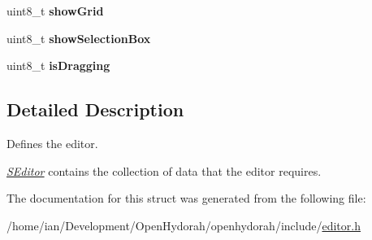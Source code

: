 \begin{DoxyCompactItemize}
\item 
\hypertarget{structSEditor_a3c96843fcda0f280e3e8c560393cebbf}{uint8\-\_\-t {\bfseries show\-Grid}}\label{structSEditor_a3c96843fcda0f280e3e8c560393cebbf}

\item 
\hypertarget{structSEditor_a7b57627167cf38fe3892e0267c89b108}{uint8\-\_\-t {\bfseries show\-Selection\-Box}}\label{structSEditor_a7b57627167cf38fe3892e0267c89b108}

\item 
\hypertarget{structSEditor_aea52ebcc1b436458c8a0c918a2e6352b}{uint8\-\_\-t {\bfseries is\-Dragging}}\label{structSEditor_aea52ebcc1b436458c8a0c918a2e6352b}

\end{DoxyCompactItemize}


\subsection{Detailed Description}
Defines the editor. 

{\itshape \hyperlink{structSEditor}{S\-Editor}} contains the collection of data that the editor requires. 

The documentation for this struct was generated from the following file\-:\begin{DoxyCompactItemize}
\item 
/home/ian/\-Development/\-Open\-Hydorah/openhydorah/include/\hyperlink{editor_8h}{editor.\-h}\end{DoxyCompactItemize}
